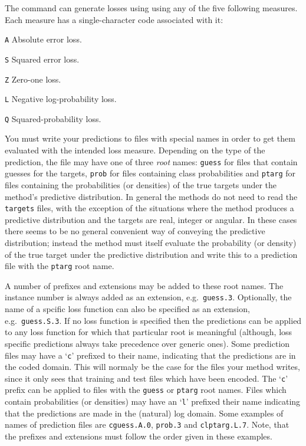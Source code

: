 The \mloss{} command can generate losses using using any of the five
following measures.  Each measure has a single-character code
associated with it:\vspace{-4pt}
\begin{list}{}{\setlength{\leftmargin}{0.6in}\setlength{\labelsep}{0.2in}}
  \item[{\tt A}] Absolute error loss.
  \item[{\tt S}] Squared error loss.
  \item[{\tt Z}] Zero-one loss.
  \item[{\tt L}] Negative log-probability loss.
  \item[{\tt Q}] Squared-probability loss.
\end{list}\vspace{-4pt}
You must write your predictions to files with special names in order
to get them evaluated with the intended loss measure. Depending on the
type of the prediction, the file may have one of three \emph{root}
names: \texttt{guess} for files that contain guesses for the targets,
\texttt{prob} for files containing class probabilities and \texttt{ptarg}
for files containing the probabilities (or densities) of the true
targets under the method's predictive distribution. In general the
methods do not need to read the \texttt{targets} files, with the
exception of the situations where the method produces a predictive
distribution and the targets are real, integer or angular. In these
cases there seems to be no general convenient way of conveying the
predictive distribution; instead the method must itself evaluate the
probability (or density) of the true target under the predictive
distribution and write this to a prediction file with the
\texttt{ptarg} root name.

A number of prefixes and extensions may be added to these root
names. The instance number is always added as an extension,
e.g.~\texttt{guess.3}. Optionally, the name of a spcific loss function
can also be specified as an extension, e.g.~\texttt{guess.S.3}.  If no
loss function is specified then the predictions can be applied to any
loss function for which that particular root is meaningful (although,
loss specific predictions always take precedence over generic
ones). Some prediction files may have a `\texttt{c}' prefixed to their
name, indicating that the predictions are in the coded domain. This
will normaly be the case for the files your method writes, since it
only sees that training and test files which have been encoded. The
`\texttt{c}' prefix can be applied to files with the \texttt{guess} or
\texttt{ptarg} root names. Files which contain probabilities (or
densities) may have an `\texttt{l}' prefixed their name indicating
that the predictions are made in the (natural) log domain. Some
examples of names of prediction files are \texttt{cguess.A.0},
\texttt{prob.3} and \texttt{clptarg.L.7}. Note, that the prefixes and
extensions must follow the order given in these examples.

